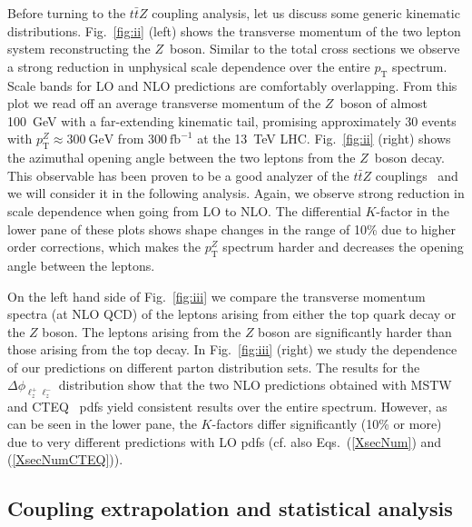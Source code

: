 \documentclass{JHEP3}
\newcommand{\GeV}{\mathrm{GeV}}
\newcommand{\pT}{p_{\mathrm{T}}}
\def\ttbZ{t\bar{t}Z}
\begin{document}
Before turning to the $\ttbZ$ coupling analysis, let us discuss some generic kinematic distributions.
Fig.~\ref{fig:ii} (left) shows the transverse momentum of the two lepton system reconstructing the $Z$~boson.
Similar to the total cross sections we observe a strong reduction in unphysical scale dependence over the entire $\pT$ spectrum.
Scale bands for LO and NLO predictions are comfortably overlapping. 
From this plot we read off an average transverse momentum of the $Z$~boson of almost 100~GeV with a far-extending kinematic tail,
promising approximately 30 events with $\pT^Z \approx 300~\GeV$ from $300~\mathrm{fb}^{-1}$ at the 13~TeV LHC. 
Fig.~\ref{fig:ii} (right) shows the azimuthal opening angle between the two leptons from the $Z$~boson decay.
This observable has been proven to be a good analyzer of the $\ttbZ$ couplings~\cite{Baur:2004uw} and we will consider it in the following analysis.
Again, we observe strong reduction in scale dependence when going from LO to NLO.
The differential $K$-factor in the lower pane of these plots shows shape changes in the range of 10\% due to higher order corrections, which makes the $\pT^Z$ spectrum harder and decreases the opening angle between the leptons.



On the left hand side of Fig.~\ref{fig:iii} we compare the transverse momentum spectra (at NLO QCD) of the leptons arising from either 
the top quark decay or the $Z$ boson. The leptons arising from the $Z$ boson are significantly harder than those arising from the top decay.
In Fig.~\ref{fig:iii} (right) we study the dependence of our predictions on different parton distribution sets. 
The results for the $\Delta \phi_{\ell^+_z \ell^-_z}$ distribution show that the two NLO predictions 
obtained with MSTW~\cite{Martin:2009iq} and CTEQ~\cite{Pumplin:2002vw,Lai:2010vv} pdfs yield consistent results over the entire spectrum.
However, as can be seen in the lower pane, the $K$-factors differ significantly (10\% or more) 
due to very different predictions with LO pdfs (cf. also Eqs.~(\ref{XsecNum}) and (\ref{XsecNumCTEQ})). 


\subsection{Coupling extrapolation and statistical analysis}
\label{sect:analysis}
\end{document}
